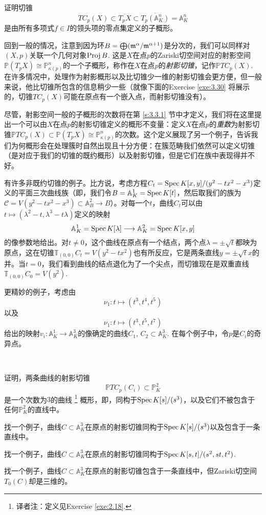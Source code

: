 \begin{exe}\label{exe:3.29}
	证明切锥
	\[
		TC_p(X)\subset \overline{T_pX}\subset \overline{T_p(\mathbb A_K^n)}=\mathbb A_K^n
	\]
	是由所有多项式$f\in I$的领头项的零点集定义的子概形。
\end{exe}

回到一般的情况，注意到因为环$B=\bigoplus (\mathfrak{m}^\alpha/\mathfrak{m}^{\alpha+1})$是分次的，我们可以同样对$(X,p)$关联一个几何对象$\operatorname{Proj} B$. 这是$X$在点$p$的Zariski切空间对应的射影空间$\mathbb P(T_p X)\cong \mathbb P^n_{\kappa(p)}$的一个子概形，称作在$X$在点$p$的\textit{射影切锥}，记作$\mathbb PTC_p(X)$. 在许多情况中，处理作为射影概形以及比切锥少一维的射影切锥会更方便，但一般来说，他比切锥所包含的信息稍少一些（就像下面的Exercise \ref{exe:3.30} 将展示的，切锥$TC_p(X)$可能在原点有一个嵌入点，而射影切锥没有）。

尽管，射影空间一般的子概形的次数将在第 \ref{s:3.3.1} 节中才定义，我们将在这里提出一个可以由$X$在点$p$的射影切锥定义的概形不变量：定义$X$在点$p$的\textit{重数}为射影切锥$\mathbb PTC_p(X)\subset \mathbb P(T_p X)\cong \mathbb P^n_{\kappa(p)}$的次数。这个定义展现了另一个例子，告诉我们为何概形会在处理簇时自然出现且十分方便：在簇范畴我们依然可以定义切锥（是对应于我们的切锥的既约概形）以及射影切锥，但是它们在族中表现得并不好。


有许多非既约切锥的例子。比方说，考虑方程$C_t=\operatorname{Spec} K[x,y]/(y^2-tx^2-x^3)$定义的平面三次曲线族（即，我们令$B=\mathbb A^1_K=\operatorname{Spec} K[t]$，然后取我们的族为$\mathscr C=V(y^2-tx^2-x^3)\subset \mathbb A_B^2\to B$）。对每一个$t$，曲线$C_t$可以由$t\mapsto (\lambda^2-t,\lambda^3-t\lambda)$定义的映射
\[
	\mathbb A_K^1=\operatorname{Spec} K[\lambda]\longrightarrow \mathbb A_K^2=\operatorname{Spec} K[x,y]
\]
的像参数地给出。对$t\neq 0$，这个曲线在原点有一个结点，两个点$\lambda =\pm \sqrt t$都映为原点，这在切锥$\mathbb T_{(0,0)}C_t=V(y^2-tx^2)$也有所反应，它是两条直线$y=\pm \sqrt t x$的并。当$t=0$，我们看到曲线的结点退化为了一个尖点，而切锥现在是双重直线$\mathbb T_{(0,0)}C_0=V(y^2)$.

更精妙的例子，考虑由
\[
	\nu_1:t\longmapsto (t^3,t^4,t^5)
\]
以及
\[
	\nu_1:t\longmapsto (t^3,t^5,t^7)
\]
给出的映射$v_i:\mathbb A_K^1\to \mathbb A_K^3$的像确定的曲线$C_1$, $C_2\subset \mathbb A_K^3$. 在每个例子中，令$p$是$C_i$的奇异点。

\begin{exe}~\label{exe:3.30}
	\begin{compactenum}[(a)]
		\item 证明，两条曲线的射影切锥
		\[
			\mathbb PTC_p(C_i)\subset \mathbb P_K^2
		\]
		是一个次数为$3$的曲线%
		\footnote{
			译者注：定义见Exercise \ref{exe:2.18}.
		}%
		概形，即，同构于$\operatorname{Spec} K[s]/(s^3)$，以及它们不被包含于任何$\mathbb P_K^2$的直线中。
		\item 找一个例子，曲线$C\subset \mathbb A_K^3$在原点的射影切锥同构于$\operatorname{Spec} K[s]/(s^3)$以及包含于一条直线中。
		\item 找一个例子，曲线$C\subset \mathbb A_K^3$在原点的射影切锥同构于$\operatorname{Spec} K[s,t]/(s^2,st,t^2)$.
		\item 找一个例子，曲线$C\subset \mathbb A_K^3$在原点的射影切锥包含于一条直线中，但Zariski切空间$T_0(C)$却是三维的。
	\end{compactenum}
\end{exe}

